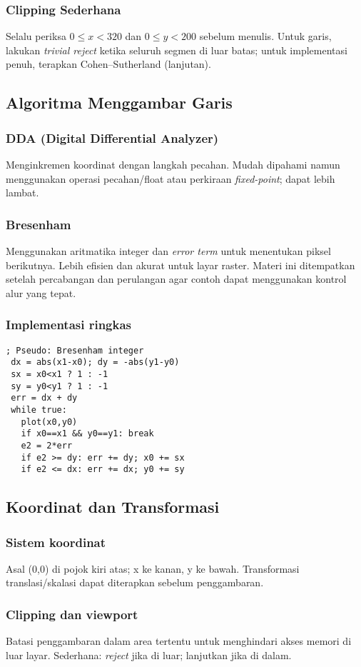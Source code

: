 \documentclass[../main.tex]{subfiles}
\begin{document}
            \subsubsection{Clipping Sederhana}
                Selalu periksa \(0 \le x < 320\) dan \(0 \le y < 200\) sebelum menulis. Untuk garis, lakukan \textit{trivial reject} ketika seluruh segmen di luar batas; untuk implementasi penuh, terapkan Cohen–Sutherland (lanjutan).

        \subsection{Algoritma Menggambar Garis}
            \subsubsection{DDA (Digital Differential Analyzer)}
                Menginkremen koordinat dengan langkah pecahan. Mudah dipahami namun menggunakan operasi pecahan/float atau perkiraan \textit{fixed-point}; dapat lebih lambat.

            \subsubsection{Bresenham}
                Menggunakan aritmatika integer dan \textit{error term} untuk menentukan piksel berikutnya. Lebih efisien dan akurat untuk layar raster. Materi ini ditempatkan setelah percabangan dan perulangan agar contoh dapat menggunakan kontrol alur yang tepat.

            \subsubsection{Implementasi ringkas}
                \begin{verbatim}
; Pseudo: Bresenham integer
 dx = abs(x1-x0); dy = -abs(y1-y0)
 sx = x0<x1 ? 1 : -1
 sy = y0<y1 ? 1 : -1
 err = dx + dy
 while true:
   plot(x0,y0)
   if x0==x1 && y0==y1: break
   e2 = 2*err
   if e2 >= dy: err += dy; x0 += sx
   if e2 <= dx: err += dx; y0 += sy
                \end{verbatim}

        \subsection{Koordinat dan Transformasi}
            \subsubsection{Sistem koordinat}
                Asal (0,0) di pojok kiri atas; x ke kanan, y ke bawah. Transformasi translasi/skalasi dapat diterapkan sebelum penggambaran.

            \subsubsection{Clipping dan viewport}
                Batasi penggambaran dalam area tertentu untuk menghindari akses memori di luar layar. Sederhana: \textit{reject} jika di luar; lanjutkan jika di dalam.
\end{document}
